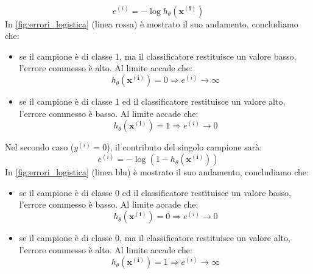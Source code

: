  \begin{equation*}
 e^{(i)}=-\log{h_\theta(\mathbf{x^{(i)}})} 
 \end{equation*}
 In \autoref{fig:errori_logistica} (linea rossa) è mostrato il suo andamento, concludiamo che:
\begin{itemize}
\item se il campione è di classe 1, ma il classificatore restituisce un valore basso, l'errore commesso è alto. Al limite accade che:
\begin{equation*}
h_\theta(\mathbf{x^{(i)}}) = 0 \Rightarrow e^{(i)} \rightarrow \infty
\end{equation*}
\item se il campione è di classe 1 ed il classificatore restituisce un valore alto, l'errore commesso è basso. Al limite accade che:
\begin{equation*}
h_\theta(\mathbf{x^{(i)}}) = 1 \Rightarrow e^{(i)} \rightarrow 0
\end{equation*}
\end{itemize}
Nel secondo caso ($y^{(i)}=0$), il contributo del singolo campione sarà:
\begin{equation*}
 e^{(i)}=-\log{(1-h_\theta(\mathbf{x^{(i)}}))} 
 \end{equation*}
In \autoref{fig:errori_logistica} (linea blu) è mostrato il suo andamento, concludiamo che:
\begin{itemize}
\item se il campione è di classe 0 ed il classificatore restituisce un valore basso, l'errore commesso è basso. Al limite accade che:
\begin{equation*}
h_\theta(\mathbf{x^{(i)}}) = 0 \Rightarrow e^{(i)} \rightarrow 0
\end{equation*}
\item se il campione è di classe 0, ma il classificatore restituisce un valore alto, l'errore commesso è alto. Al limite accade che:
\begin{equation*}
h_\theta(\mathbf{x^{(i)}}) = 1 \Rightarrow e^{(i)} \rightarrow \infty
\end{equation*}
\end{itemize}



